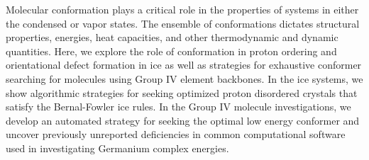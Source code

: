 Molecular conformation plays a critical role in the properties of systems in either the condensed or vapor states. 
The ensemble of conformations dictates structural properties, energies, heat capacities, and other thermodynamic and dynamic quantities. 
Here, we explore the role of conformation in proton ordering and orientational defect formation in ice as well as strategies for exhaustive conformer searching for molecules using Group IV element backbones. 
In the ice systems, we show algorithmic strategies for seeking optimized proton disordered crystals that satisfy the Bernal-Fowler ice rules. 
In the Group IV molecule investigations, we develop an automated strategy for seeking the optimal low energy conformer and uncover previously unreported deficiencies in common computational software used in investigating Germanium complex energies.